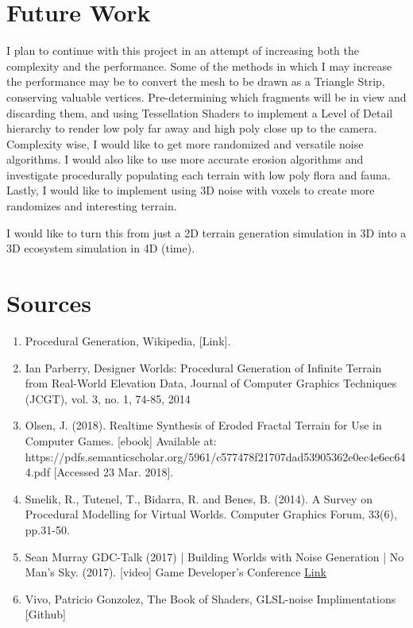 \documentclass[12pt]{article}
\begin{document}
    \section{Future Work}
        I plan to continue with this project in an attempt of increasing both the complexity and the performance.
        Some of the methods in which I may increase the performance may be to convert the mesh to be drawn as a Triangle Strip,
        conserving valuable vertices. Pre-determining which fragments will be in view and discarding them, and using Tessellation 
        Shaders to implement a Level of Detail hierarchy to render low poly far away and high poly close up to the camera.
        Complexity wise, I would like to get more randomized and versatile noise algorithms. I would also like to use more accurate 
        erosion algorithms and investigate procedurally populating each terrain with low poly flora and fauna.
        Lastly, I would like to implement using 3D noise with voxels to create more randomizes and interesting terrain.

        I would like to turn this from just a 2D terrain generation simulation in 3D into a 3D ecosystem simulation in 4D (time).

\section{Sources} 
    \begin{enumerate}
        \item Procedural Generation, Wikipedia, \href{https://en.wikipedia.org/wiki/Procedural_generation}[Link].
        \item Ian Parberry, Designer Worlds: Procedural Generation of Infinite Terrain from Real-World Elevation Data, Journal of Computer Graphics Techniques (JCGT), vol. 3, no. 1, 74-85, 2014
        \item Olsen, J. (2018). Realtime Synthesis of Eroded Fractal Terrain for Use in Computer Games. [ebook] Available at: https://pdfs.semanticscholar.org/5961/c577478f21707dad53905362e0ec4e6ec644.pdf [Accessed 23 Mar. 2018]. 
        \item Smelik, R., Tutenel, T., Bidarra, R. and Benes, B. (2014). A Survey on Procedural Modelling for Virtual Worlds. Computer Graphics Forum, 33(6), pp.31-50.
        \item Sean Murray GDC-Talk (2017) | Building Worlds with Noise Generation | No Man's Sky. (2017). [video] Game Developer's Conference \href{https://www.youtube.com/watch?v=SePDzis8HqY}{Link}
        \item Vivo, Patricio Gonzolez, The Book of Shaders, GLSL-noise Implimentations \href{https://gist.github.com/patriciogonzalezvivo/670c22f3966e662d2f83}[Github]
    \end{enumerate}  
\end{document}
